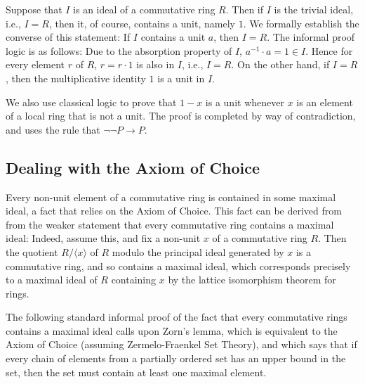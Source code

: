 \documentclass{article}
\begin{document}
Suppose that $I$ is an ideal of a commutative ring $R$.   Then if $I$ is the trivial ideal, i.e., $I = R$, then it, of course, contains a unit, namely $1$. 
We formally establish the converse of this statement: If $I$ contains a
unit $a$, then $I=R$. 
The informal proof logic is as follows:  Due to the absorption property of $I$,  
$a^{-1}  \cdot a= 1 \in I$.  Hence for every element $r$ of $R$,
$r = r \cdot 1$ is also in $I$, i.e., $I=R$. 
On the other hand, if $I = R$, then the multiplicative identity $1$ is a unit in $I$.  


We also use classical logic to prove that \(1 - x\) is a unit whenever \(x\)
is an element of a local ring that is not a unit. The proof is completed by way
of contradiction, and uses the rule that \(\neg\neg P\rightarrow P\).

\subsection{Dealing with the Axiom of Choice}


Every non-unit element of a commutative ring is contained in some maximal
ideal, a fact that relies on the Axiom of Choice. 
This fact can be derived from from the weaker statement that every commutative ring contains a maximal ideal:
Indeed, assume this, and fix a non-unit $x$ of a commutative ring $R$.  Then the quotient $R/\langle x \rangle$ of $R$ modulo 
the principal ideal generated by $x$ is a commutative ring, and so contains a maximal ideal, which corresponds precisely to a 
maximal ideal of $R$ containing $x$ by   
the lattice isomorphism theorem for rings. 

The following standard informal proof of the fact that every commutative rings contains a maximal ideal calls upon Zorn's lemma, 
which is equivalent to the Axiom of Choice (assuming Zermelo-Fraenkel Set Theory), and which 
says that if every chain of elements from a partially ordered set  has an upper
bound in the set, then the set must contain at least one maximal element. 
\end{document}
